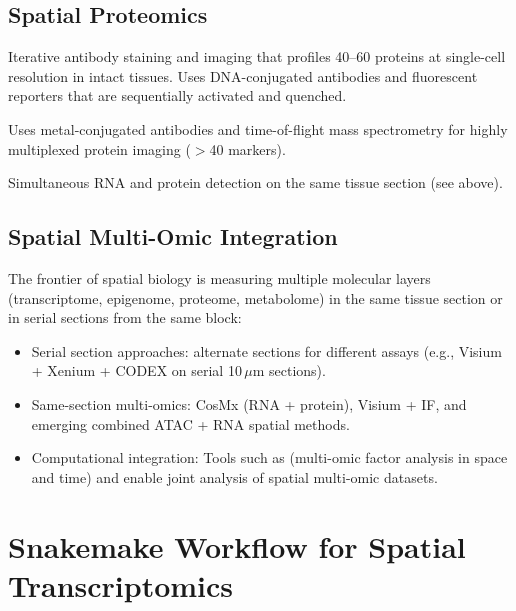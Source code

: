\subsection{Spatial Proteomics}

\begin{description}[style=nextline]
  \item[CODEX (CO-Detection by indEXing)] Iterative antibody staining and
    imaging that profiles 40--60 proteins at single-cell resolution in intact
    tissues. Uses DNA-conjugated antibodies and fluorescent reporters that
    are sequentially activated and quenched.
  \item[MIBI-TOF (Multiplexed Ion Beam Imaging)] Uses metal-conjugated
    antibodies and time-of-flight mass spectrometry for highly multiplexed
    protein imaging ($>$40 markers).
  \item[CosMx multi-omic:] Simultaneous RNA and protein detection on the same
    tissue section (see above).
\end{description}

\subsection{Spatial Multi-Omic Integration}

The frontier of spatial biology is measuring multiple molecular layers
(transcriptome, epigenome, proteome, metabolome) in the same tissue section
or in serial sections from the same block:

\begin{itemize}[nosep]
  \item Serial section approaches: alternate sections for different assays
    (e.g., Visium + Xenium + CODEX on serial 10\,$\mu$m sections).
  \item Same-section multi-omics: CosMx (RNA + protein), Visium + IF, and
    emerging combined ATAC + RNA spatial methods.
  \item Computational integration: Tools such as  (multi-omic
    factor analysis in space and time) and  enable joint
    analysis of spatial multi-omic datasets.
\end{itemize}


\section{Snakemake Workflow for Spatial Transcriptomics}
\label{sec:spatial:snakemake}


